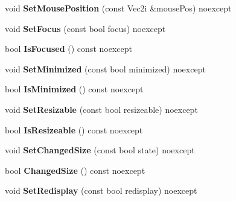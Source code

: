 \begin{DoxyCompactItemize}
\item 
\mbox{\label{class_blade_1_1_window_abc83af5bb7a8b8f598c7650caa1aadd9}} 
void {\bfseries Set\+Mouse\+Position} (const Vec2i \&mouse\+Pos) noexcept
\item 
\mbox{\label{class_blade_1_1_window_a3a6c08f143395f1da5214d59e9550460}} 
void {\bfseries Set\+Focus} (const bool focus) noexcept
\item 
\mbox{\label{class_blade_1_1_window_ad3448e470641403f385fed1dae07055b}} 
bool {\bfseries Is\+Focused} () const noexcept
\item 
\mbox{\label{class_blade_1_1_window_af1816611fbcbbe9baaf6180f338872dd}} 
void {\bfseries Set\+Minimized} (const bool minimized) noexcept
\item 
\mbox{\label{class_blade_1_1_window_a889ce6ba38f9bf1b2cb3aca2af76f624}} 
bool {\bfseries Is\+Minimized} () const noexcept
\item 
\mbox{\label{class_blade_1_1_window_ab2d34e1cedd4034dc4a51edfa6f45c59}} 
void {\bfseries Set\+Resizable} (const bool resizeable) noexcept
\item 
\mbox{\label{class_blade_1_1_window_a2bc511b93dd44358fa4aeec4b17d83d6}} 
bool {\bfseries Is\+Resizeable} () const noexcept
\item 
\mbox{\label{class_blade_1_1_window_aebf2f6b23c4b5cf21183d26e9af9858c}} 
void {\bfseries Set\+Changed\+Size} (const bool state) noexcept
\item 
\mbox{\label{class_blade_1_1_window_a4efcd4d18de320aff5c1bd696cbbc17f}} 
bool {\bfseries Changed\+Size} () const noexcept
\item 
\mbox{\label{class_blade_1_1_window_ab62432e65a7b372161d69906f515176e}} 
void {\bfseries Set\+Redisplay} (const bool redisplay) noexcept
\item 
\mbox{\label{class_blade_1_1_window_ac19596587b92bd24693e7359b3571b0a}} 

\end{DoxyCompactItemize}
